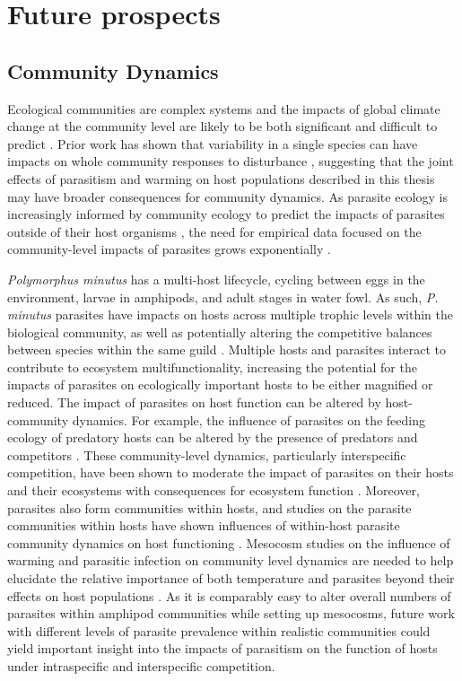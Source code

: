 \section{Future prospects} 

\subsection{Community Dynamics}

Ecological communities are complex systems and the impacts of global climate change at the community level are likely to be both significant and difficult to predict \citep{kordas2011, hewitt2016}. Prior work has shown that variability in a single species can have impacts on whole community responses to disturbance \citep{mcclean2015, mrowicki2016}, suggesting that the joint effects of parasitism and warming on host populations described in this thesis may have broader consequences for community dynamics. As parasite ecology is increasingly informed by community ecology to predict the impacts of parasites outside of their host organisms \citep{johnson2015}, the need for empirical data focused on the community-level impacts of parasites grows exponentially \citep{poulin2018best}. 

\emph{Polymorphus minutus} has a multi-host lifecycle, cycling between eggs in the environment, larvae in amphipods, and adult stages in water fowl. As such, \emph{P. minutus} parasites have impacts on hosts across multiple trophic levels within the biological community, as well as potentially altering the competitive balances between species within the same guild \citep{macneil2003}. Multiple hosts and parasites interact to contribute to ecosystem multifunctionality, increasing the potential for the impacts of parasites on ecologically important hosts to be either magnified or reduced. The impact of parasites on host function can be altered by host-community dynamics. For example, the influence of parasites on the feeding ecology of predatory hosts can be altered by the presence of predators \citep{reisinger2016} and competitors \citep{paterson2014}. These community-level dynamics, particularly interspecific competition, have been shown to moderate the impact of parasites on their hosts and their ecosystems with consequences for ecosystem function \citep{kordas2011}. Moreover, parasites also form communities within hosts, and studies on the parasite communities within hosts have shown influences of within-host parasite community dynamics on host functioning \citep{dezfuli2001, hafer2016, kirk2018}. Mesocosm studies on the influence of warming and parasitic infection on community level dynamics are needed to help elucidate the relative importance of both temperature and parasites beyond their effects on host populations \citep{woodward2010}. As it is comparably easy to alter overall numbers of parasites within amphipod communities while setting up mesocosms, future work with different levels of parasite prevalence within realistic communities could yield important insight into the impacts of parasitism on the function of hosts under intraspecific and interspecific competition. 

